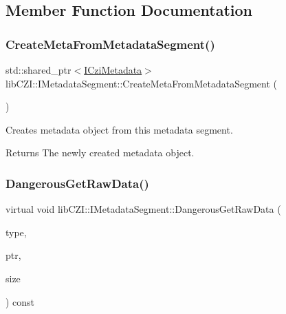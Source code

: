 \subsection{Member Function Documentation}
\mbox{\label{classlib_c_z_i_1_1_i_metadata_segment_a62a0e7c30613b6f4dac3bf1ca80ab8bc}} 
\subsubsection{\texorpdfstring{Create\+Meta\+From\+Metadata\+Segment()}{CreateMetaFromMetadataSegment()}}
{\footnotesize\ttfamily std\+::shared\+\_\+ptr$<$\hyperlink{classlib_c_z_i_1_1_i_czi_metadata}{I\+Czi\+Metadata}$>$ lib\+C\+Z\+I\+::\+I\+Metadata\+Segment\+::\+Create\+Meta\+From\+Metadata\+Segment (\begin{DoxyParamCaption}{ }\end{DoxyParamCaption})\hspace{0.3cm}{\ttfamily [inline]}}

Creates metadata object from this metadata segment. \begin{DoxyReturn}{Returns}
The newly created metadata object. 
\end{DoxyReturn}
\mbox{\label{classlib_c_z_i_1_1_i_metadata_segment_a749349eab738a5fd7e5bce2e67440953}} 
\subsubsection{\texorpdfstring{Dangerous\+Get\+Raw\+Data()}{DangerousGetRawData()}}
{\footnotesize\ttfamily virtual void lib\+C\+Z\+I\+::\+I\+Metadata\+Segment\+::\+Dangerous\+Get\+Raw\+Data (\begin{DoxyParamCaption}\item[{\hyperlink{classlib_c_z_i_1_1_i_metadata_segment_a3acd5e2bf5161629f1ee56ecef9b3b72}{Mem\+Blk\+Type}}]{type,  }\item[{const void $\ast$\&}]{ptr,  }\item[{size\+\_\+t \&}]{size }\end{DoxyParamCaption}) const\hspace{0.3cm}{\ttfamily [pure virtual]}}

